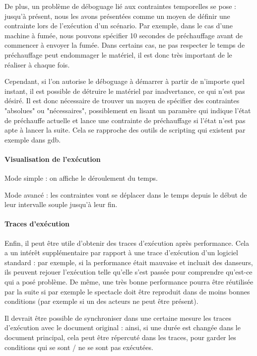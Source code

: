 \documentclass{sigchi}
\begin{document}
De plus, un problème de déboguage lié aux contraintes temporelles se pose : jusqu'à présent, nous les avons présentées comme un moyen de définir une contrainte lors de l'exécution d'un scénario. Par exemple, dans le cas d'une machine à fumée, nous pouvons spécifier 10 secondes de préchauffage avant de commencer à envoyer la fumée. Dans certains cas, ne pas respecter le temps de préchauffage peut endommager le matériel, il est donc très important de le réaliser à chaque fois.

Cependant, si l'on autorise le déboguage à démarrer à partir de n'importe quel instant, il est possible de détruire le matériel par inadvertance, ce qui n'est pas désiré. Il est donc nécessaire de trouver un moyen de spécifier des contraintes "absolues" ou "nécessaires", possiblement en lisant un paramère qui indique l'état de préchauffe actuelle et lance une contrainte de préchauffage si l'état n'est pas apte à lancer la suite. Cela se rapproche des outils de scripting qui existent par exemple dans gdb.

\paragraph{Visualisation de l'exécution}
Mode simple : on affiche le déroulement du temps.

Mode avancé : les contraintes vont se déplacer dans le temps depuis le début de leur intervalle souple jusqu'à leur fin.

\paragraph{Traces d'exécution}
Enfin, il peut être utile d'obtenir des traces d'exécution après performance. Cela a un intérêt supplémentaire par rapport à une trace d'exécution d'un logiciel standard : par exemple, si la performance était mauvaise et incluait des danseurs, ils peuvent rejouer l'exécution telle qu'elle s'est passée pour comprendre qu'est-ce qui a posé problème. De même, une très bonne performance pourra être réutilisée par la suite si par exemple le spectacle doit être reproduit dans de moins bonnes conditions (par exemple si un des acteurs ne peut être présent).

Il devrait être possible de synchroniser dans une certaine mesure les traces d'exécution avec le document original : ainsi, si une durée est changée dans le document principal, cela peut être répercuté dans les traces, pour garder les conditions qui se sont / ne se sont pas exécutées.
\end{document}

